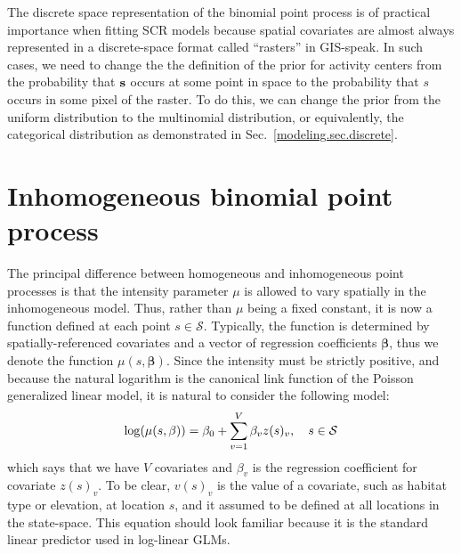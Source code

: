 The discrete space representation of the binomial point process is of
practical importance when fitting SCR models because spatial covariates
are almost always represented in a discrete-space format called
``rasters'' in GIS-speak. In such cases, we need to change the
the definition of the prior for activity centers from the probability
that $\bf s$ occurs at some point in space to the probability that $s$
occurs in some pixel of the raster. To do this, we can change the
prior from the uniform distribution to the
multinomial distribution, or equivalently, the categorical
distribution as demonstrated in Sec.~\ref{modeling.sec.discrete}.



\section{Inhomogeneous binomial point process}

The principal difference between homogeneous and inhomogeneous point
processes is that the intensity parameter $\mu$ is allowed to vary spatially
in the inhomogeneous model. Thus, rather than $\mu$ being a fixed constant,
it is now a function defined at each point $s \in
\mathcal{S}$. Typically, the function is determined by
spatially-referenced covariates and a vector of regression
coefficients $\bm \beta$, thus we denote the function $\mu(s,
\bm{\beta})$. Since the intensity must be strictly
positive, and because the natural logarithm is the canonical link
function of the Poisson generalized linear model, it is natural to
consider the following model:
\begin{equation}
  \log(\mu(s, \beta)) = \beta_0 + \sum_{v=1}^V \beta_v z(s)_v, \quad  s \in \cal{S}
  \label{state-space.eq.loglin}
\end{equation}
which says that we have $V$ covariates and $\beta_v$ is the regression coefficient for covariate
$z(s)_v$. To be clear, $v(s)_v$ is the value of a covariate, such as
habitat type or elevation, at location $s$, and it assumed to be
defined at all locations in the state-space.
This equation should look
familiar because it is the standard linear predictor used in log-linear
GLMs.

